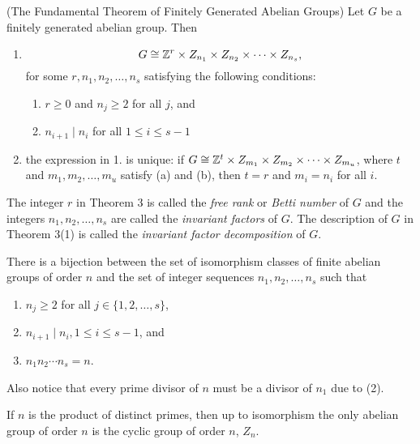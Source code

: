 \documentclass[../main]{subfiles}
\begin{document}
\begin{thm}
 (The Fundamental Theorem of Finitely Generated Abelian Groups) Let $G$ be a finitely generated abelian group. Then
 \begin{enumerate}
  \item \[G \cong \mathbb{Z}^r \times Z_{n_1} \times Z_{n_2} \times \cdots \times Z_{n_s}, \]
  for some $r,n_1,n_2, \ldots , n_s$ satisfying the following conditions:
    \begin{enumerate}
        \item $r \geq 0$ and $n_j \geq 2$ for all $j$, and 
        \item $n_{i+1} \mid n_i$ for all $1 \leq i \leq s-1$
    \end{enumerate}
    
    \item the expression in 1. is unique: if $G \cong \mathbb{Z}^t \times Z_{m_1} \times Z_{m_2} \times \cdots \times Z_{m_u}$, where $t$ and $m_1, m_2, \ldots , m_u$ satisfy (a) and (b), then $t = r$ and $m_i = n_i$ for all $i$. 
 \end{enumerate}
\end{thm}


\begin{dfn}
 The integer $r$ in Theorem 3 is called the \textit{free rank} or \textit{Betti number} of $G$ and the integers $n_1, n_2, \ldots , n_s$ are called the \textit{invariant factors} of $G$. The description of $G$ in Theorem 3(1) is called the \textit{invariant factor decomposition} of $G$.
\end{dfn}


\begin{nt}
 There is a bijection between the set of isomorphism classes of finite abelian groups of order $n$ and the set of integer sequences $n_1, n_2, \ldots , n_s$ such that 
 \begin{enumerate}
  \item $n_j \geq 2$ for all $j \in \{1, 2, \ldots , s\}$,
  \item $n_{i+1} \mid n_i, 1 \leq i \leq s-1$, and 
  \item $n_1 n_2 \cdots n_s = n$.
 \end{enumerate}
 Also notice that every prime divisor of $n$ must be a divisor of $n_1$ due to (2).
\end{nt}


\begin{cor}
 If $n$ is the product of distinct primes, then up to isomorphism the only abelian group of order $n$ is the cyclic group of order $n$, $Z_n$.
\end{cor}
\end{document}
